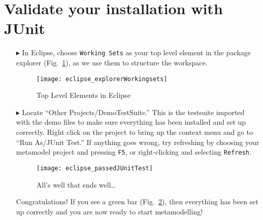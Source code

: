 \newpage
\genHeader
\hypertarget{validate common}{} 
\section{Validate your installation with JUnit}

\begin{itemize}

\item[$\blacktriangleright$] In Eclipse, choose \texttt{Working Sets} as your top level element in the package explorer (Fig.~\ref{fig_topLevel}), as we use
them to structure the workspace.

\begin{figure}[htbp]
	\centering
  \texttt{[image: eclipse\_explorerWorkingsets]}
	\caption{Top Level Elements in Eclipse}
	\label{fig_topLevel}
\end{figure}

\item[$\blacktriangleright$] Locate ``Other Projects/DemoTestSuite.'' This is the testsuite imported with the demo files to make sure everything has been installed and
set up correctly. Right click on the project to bring up the context menu and go to ``Run As/JUnit Test.'' If anything goes wrong, try refreshing by choosing
your metamodel project and pressing  \texttt{F5}, or right-clicking and selecting \texttt{Refresh}.

\vspace{0.5cm}

\begin{figure}[htbp]
	\centering
  \texttt{[image: eclipse\_passedJUnitTest]}
	\caption{All's well that ends well\ldots}
	\label{fig_passedTest}
\end{figure}

\vspace{0.5cm}

Congratulations!  If you see a green bar  (Fig.~\ref{fig_passedTest}), then everything has been set up correctly and you are now ready to start metamodelling!


\end{itemize}
